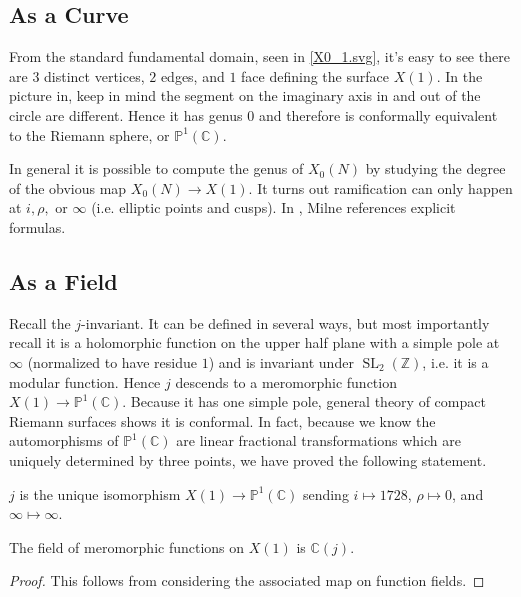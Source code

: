\documentclass[11pt]{article}
\newcommand{\BB}[1]{\mathbb{#1}} %
\newcommand{\CC}{\BB{C}}
\newcommand{\ZZ}{\BB{Z}}
\newcommand{\PP}{\BB{P}}
\newcommand{\SL}{\operatorname{SL}}
\theoremstyle{plain}
\theoremstyle{remark}
\begin{document}
\subsection{As a Curve}

From the standard fundamental domain, seen in \autoref{X0_1.svg}, it's easy to see there are $3$ distinct vertices, $2$ edges, and $1$ face defining the surface $X(1)$. In the picture in, keep in mind the segment on the imaginary axis in and out of the circle are different. Hence it has genus $0$ and therefore is conformally equivalent to the Riemann sphere, or $\PP^1(\CC)$.

\begin{note}
	In general it is possible to compute the genus of $X_0(N)$ by studying the degree of the obvious map $X_0(N) \to X(1)$. It turns out ramification can only happen at $i,\rho,$ or $\infty$ (i.e. elliptic points and cusps). In \cite[Chapter 5 Section 2]{milne}, Milne references explicit formulas.
\end{note}

\subsection{As a Field}

Recall the $j$-invariant. It can be defined in several ways, but most importantly recall it is a holomorphic function on the upper half plane with a simple pole at $\infty$ (normalized to have residue $1$) and is invariant under $\SL_2(\ZZ)$, i.e. it is a modular function. Hence $j$ descends to a meromorphic function $X(1)\to\PP^1(\CC)$. Because it has one simple pole, general theory of compact Riemann surfaces shows it is conformal. In fact, because we know the automorphisms of $\PP^1(\CC)$ are linear fractional transformations which are uniquely determined by three points, we have proved the following statement.

\begin{thm}
	$j$ is the unique isomorphism $X(1) \to \PP^1(\CC)$ sending $i\mapsto 1728$, $\rho\mapsto 0$, and $\infty\mapsto\infty$.
\end{thm}

\begin{cor}
	The field of meromorphic functions on $X(1)$ is $\CC(j)$.
\end{cor}
\begin{proof}
	This follows from considering the associated map on function fields.
\end{proof}
\end{document}
